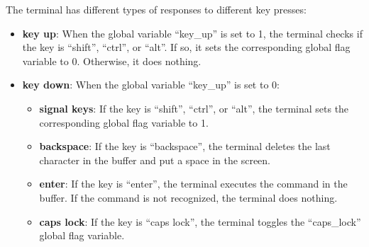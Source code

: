 \documentclass[
	a4paper, %
	11pt, %
]{CSUniSchoolLabReport}
\begin{document}
The terminal has different types of responses to different key presses:
\begin{itemize}
    \item \textbf{key up}: When the global variable ``key\_up'' is set to 1, the terminal checks if the key is ``shift'', ``ctrl'', or ``alt''. If so, it sets the corresponding global flag variable to 0. Otherwise, it does nothing.
    \item \textbf{key down}: When the global variable ``key\_up'' is set to 0:
          \begin{itemize}
              \item \textbf{signal keys}: If the key is ``shift'', ``ctrl'', or ``alt'', the terminal sets the corresponding global flag variable to 1.
              \item \textbf{backspace}: If the key is ``backspace'', the terminal deletes the last character in the buffer and put a space in the screen.
              \item \textbf{enter}: If the key is ``enter'', the terminal executes the command in the buffer. If the command is not recognized, the terminal does nothing.
              \item \textbf{caps lock}: If the key is ``caps lock'', the terminal toggles the ``caps\_lock'' global flag variable.
          \end{itemize}
\end{itemize}
\end{document}
